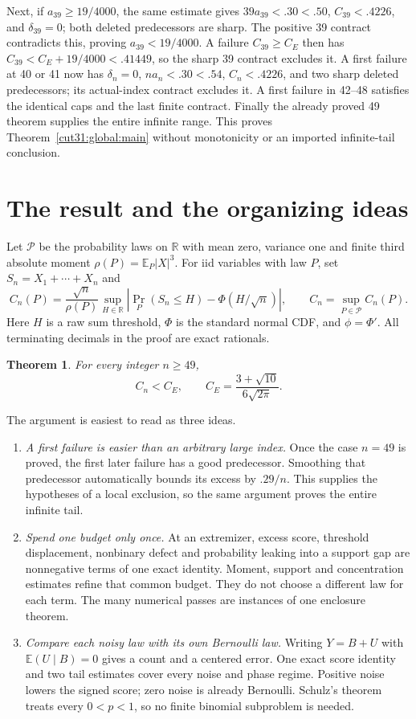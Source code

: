 \documentclass[11pt,a4paper]{article}
\numberwithin{equation}{section}
\newtheorem{theorem}{Theorem}[section]
\theoremstyle{definition}
\theoremstyle{remark}
\begin{document}
Next, if \(a_{39}\ge19/4000\), the same estimate gives
\(39a_{39}<.30<.50\), \(C_{39}<.4226\), and
\(\delta_{39}=0\); both deleted predecessors are sharp.
The positive 39 contract contradicts this, proving
\(a_{39}<19/4000\). A failure \(C_{39}\ge C_E\) then has
\(C_{39}<C_E+19/4000<.41449\), so the sharp 39 contract
excludes it. A first failure at 40 or 41 now has
\(\delta_n=0\), \(na_n<.30<.54\), \(C_n<.4226\), and
two sharp deleted predecessors; its actual-index contract excludes it.
A first failure in 42--48 satisfies the identical caps and the
last finite contract. Finally the already proved 49 theorem supplies
the entire infinite range. This proves Theorem~\ref{cut31:global:main}
without monotonicity or an imported infinite-tail conclusion.

\clearpage
\section{The result and the organizing ideas}\label{cut49:intro:chapter}
Let $\mathcal P$ be the probability laws on $\mathbb R$ with mean zero,
variance one and finite third absolute moment $\rho(P)=\mathbb E_P|X|^3$.
For iid variables with law $P$, set $S_n=X_1+\cdots+X_n$ and
\[
 C_n(P)=\frac{\sqrt n}{\rho(P)}\sup_{H\in\mathbb R}
 \left|\Pr_P(S_n\le H)-\Phi(H/\sqrt n)\right|,
 \qquad C_n=\sup_{P\in\mathcal P}C_n(P).
\]
Here $H$ is a raw sum threshold, $\Phi$ is the standard normal CDF,
and $\phi=\Phi'$. All terminating decimals in the proof are exact rationals.

\begin{theorem}\label{cut49:global:main}
For every integer $n\ge49$,
\[
 C_n<C_E,\qquad C_E=\frac{3+\sqrt{10}}{6\sqrt{2\pi}}.
\]
\end{theorem}

The argument is easiest to read as three ideas.
\begin{enumerate}[leftmargin=*]
\item \emph{A first failure is easier than an arbitrary large index.}
Once the case $n=49$ is proved, the first later failure has a good
predecessor. Smoothing that predecessor automatically bounds its excess
by $.29/n$. This supplies the hypotheses of a local exclusion, so the
same argument proves the entire infinite tail.
\item \emph{Spend one budget only once.}
At an extremizer, excess score, threshold displacement, nonbinary
defect and probability leaking into a support gap are nonnegative
terms of one exact identity. Moment, support and concentration estimates
refine that common budget. They do not choose a different law for each
term. The many numerical passes are instances of one enclosure theorem.
\item \emph{Compare each noisy law with its own Bernoulli law.}
Writing $Y=B+U$ with $\mathbb E(U\mid B)=0$ gives a count and a centered
error. One exact score identity and two tail estimates cover every
noise and phase regime. Positive noise lowers the signed score;
zero noise is already Bernoulli. Schulz's theorem treats every
$0<p<1$, so no finite binomial subproblem is needed.
\end{enumerate}
\end{document}
